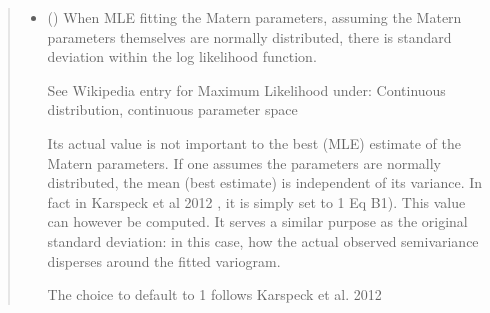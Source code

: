 \documentclass[letterpaper,10pt,english]{sphinxmanual}
\begin{document}
\begin{fulllineitems}
\begin{quote}
\begin{description}
\begin{itemize}
\item {}
\sphinxAtStartPar
{} () \textendash{}
\sphinxAtStartPar
When MLE fitting the Matern parameters,
assuming the Matern parameters themselves
are normally distributed,
there is standard deviation within the log likelihood function.

\sphinxAtStartPar
See Wikipedia entry for Maximum Likelihood under:
\sphinxhyphen{} Continuous distribution, continuous parameter space

\sphinxAtStartPar
Its actual value is not important
to the best (MLE) estimate of the Matern parameters.
If one assumes the parameters are normally distributed,
the mean (best estimate) is independent of its variance.
In fact in Karspeck et al 2012 , it is simply set to 1
Eq B1).
This value can however be computed. It serves a similar purpose as
the original standard deviation:
in this case, how the actual observed semivariance disperses
around the fitted variogram.

\sphinxAtStartPar
The choice to default to 1 follows Karspeck et al. 2012 


\end{itemize}

\end{description}\end{quote}


\end{fulllineitems}
\end{document}
